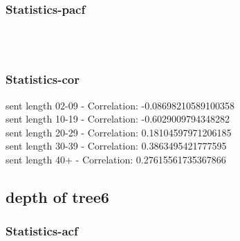 \documentclass{article}%
\begin{document}
%
\newpage%
\subsubsection{Statistics{-}pacf}%
\label{ssubsec:Statistics{-}pacf}%


\begin{figure}[ht]%
\centering%
\setlength{\abovecaptionskip}{-35pt}%
%
%
\\%
%
%
\\%
%
\end{figure}

%
\newpage%
\subsubsection{Statistics{-}cor}%
\label{ssubsec:Statistics{-}cor}%
\noindent%
sent length 02-09 - Correlation: -0.08698210589100358\\%
sent length 10-19 - Correlation: -0.6029009794348282\\%
sent length 20-29 - Correlation: 0.18104597971206185\\%
sent length 30-39 - Correlation: 0.3863495421777595\\%
sent length 40+ - Correlation: 0.27615561735367866\\

%
\newpage

%
\subsection{depth of tree6}%
\label{subsec:depthoftree6}%
\subsubsection{Statistics{-}acf}%
\label{ssubsec:Statistics{-}acf}%
\end{document}
